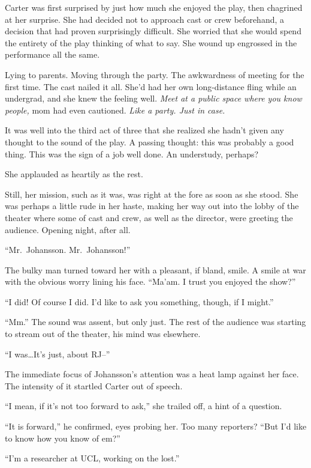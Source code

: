 Carter was first surprised by just how much she enjoyed the play, then chagrined at her surprise. She had decided not to approach cast or crew beforehand, a decision that had proven surprisingly difficult. She worried that she would spend the entirety of the play thinking of what to say. She wound up engrossed in the performance all the same.

Lying to parents. Moving through the party. The awkwardness of meeting for the first time. The cast nailed it all. She'd had her own long-distance fling while an undergrad, and she knew the feeling well. \emph{Meet at a public space where you know people,} mom had even cautioned. \emph{Like a party. Just in case.}

It was well into the third act of three that she realized she hadn't given any thought to the sound of the play. A passing thought: this was probably a good thing. This was the sign of a job well done. An understudy, perhaps?

She applauded as heartily as the rest.

Still, her mission, such as it was, was right at the fore as soon as she stood. She was perhaps a little rude in her haste, making her way out into the lobby of the theater where some of cast and crew, as well as the director, were greeting the audience. Opening night, after all.

``Mr.~Johansson. Mr.~Johansson!''

The bulky man turned toward her with a pleasant, if bland, smile. A smile at war with the obvious worry lining his face. ``Ma'am. I trust you enjoyed the show?''

``I did! Of course I did. I'd like to ask you something, though, if I might.''

``Mm.'' The sound was assent, but only just. The rest of the audience was starting to stream out of the theater, his mind was elsewhere.

``I was\ldots{}It's just, about RJ--''

The immediate focus of Johansson's attention was a heat lamp against her face. The intensity of it startled Carter out of speech.

``I mean, if it's not too forward to ask,'' she trailed off, a hint of a question.

``It is forward,'' he confirmed, eyes probing her. Too many reporters? ``But I'd like to know how you know of em?''

``I'm a researcher at UCL, working on the lost.''

